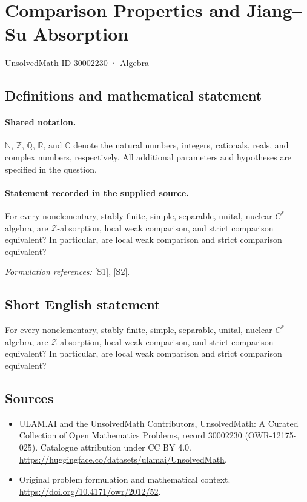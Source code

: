 \documentclass[11pt]{article}
\newcommand{\sref}[2]{\hyperlink{source:#1:#2}{[S#2]}}
\begin{document}
\setcounter{section}{30002229}
\section{Comparison Properties and Jiang–Su Absorption}\label{30002230}
{\small UnsolvedMath ID 30002230 · Algebra}
\subsection{Definitions and mathematical statement}

\paragraph{Shared notation.}$\mathbb N$, $\mathbb Z$, $\mathbb Q$, $\mathbb R$, and $\mathbb C$ denote the natural numbers, integers, rationals, reals, and complex numbers, respectively. All additional parameters and hypotheses are specified in the question.


\paragraph{Statement recorded in the supplied source.}
For every nonelementary, stably finite, simple, separable, unital, nuclear $C^*$-algebra, are $\mathcal Z$-absorption, local weak comparison, and strict comparison equivalent? In particular, are local weak comparison and strict comparison equivalent?
\par\smallskip\textit{Formulation references:} \sref{30002230}{1}, \sref{30002230}{2}.
\subsection{Short English statement}
For every nonelementary, stably finite, simple, separable, unital, nuclear $C^*$-algebra, are $\mathcal Z$-absorption, local weak comparison, and strict comparison equivalent? In particular, are local weak comparison and strict comparison equivalent?
\subsection{Sources}
\begin{itemize}
\item[\hypertarget{source:30002230:1}{S1}] ULAM.AI and the UnsolvedMath Contributors, UnsolvedMath: A Curated Collection of Open Mathematics Problems, record 30002230 (OWR-12175-025). Catalogue attribution under CC BY 4.0.
\url{https://huggingface.co/datasets/ulamai/UnsolvedMath}.
\item[\hypertarget{source:30002230:2}{S2}] Original problem formulation and mathematical context.
\url{https://doi.org/10.4171/owr/2012/52}.
\end{itemize}
\label{end:30002230}
\end{document}
